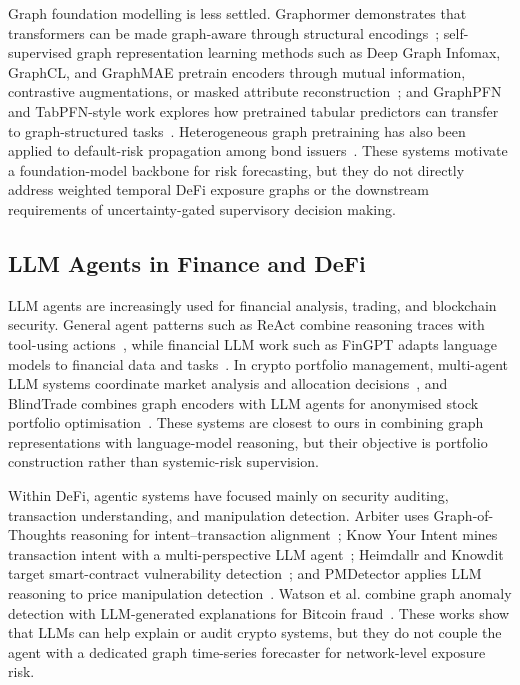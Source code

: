 Graph foundation modelling is less settled. Graphormer demonstrates that
transformers can be made graph-aware through structural
encodings~\cite{Ying2021Graphormer}; self-supervised graph representation
learning methods such as Deep Graph Infomax, GraphCL, and GraphMAE pretrain
encoders through mutual information, contrastive augmentations, or masked
attribute reconstruction~\cite{VelickovicEtAl2019DGI,YouEtAl2020GraphCL,
HouEtAl2022GraphMAE}; and GraphPFN and TabPFN-style work explores how
pretrained tabular predictors can transfer to graph-structured tasks~\cite{
HollmannEtAl2025TabPFN,eremeev2025turningtabularfoundationmodels}. Heterogeneous
graph pretraining has also been applied to default-risk propagation among bond
issuers~\cite{li2025hgmae}. These systems motivate a foundation-model backbone
for risk forecasting, but they do not directly address weighted temporal DeFi
exposure graphs or the downstream requirements of uncertainty-gated supervisory
decision making.

\subsection{LLM Agents in Finance and DeFi}

LLM agents are increasingly used for financial analysis, trading, and
blockchain security. General agent patterns such as ReAct combine reasoning
traces with tool-using actions~\cite{YaoEtAl2023ReAct}, while financial LLM
work such as FinGPT adapts language models to financial data and
tasks~\cite{YangEtAl2023FinGPT}. In crypto portfolio management, multi-agent
LLM systems coordinate market analysis and allocation decisions~\cite{
luo2025llmcrypto}, and BlindTrade combines graph encoders with LLM agents for
anonymised stock portfolio optimisation~\cite{jeon2026blindtrade}. These
systems are closest to ours in combining graph representations with
language-model reasoning, but their objective is portfolio construction rather
than systemic-risk supervision.

Within DeFi, agentic systems have focused mainly on security auditing,
transaction understanding, and manipulation detection. Arbiter uses
Graph-of-Thoughts reasoning for intent--transaction alignment~\cite{
yao2025arbiter}; Know Your Intent mines transaction intent with a
multi-perspective LLM agent~\cite{mao2025knowyourintent}; Heimdallr and
Knowdit target smart-contract vulnerability detection~\cite{
hu2026heimdallr,kong2026knowdit}; and PMDetector applies LLM reasoning to
price manipulation detection~\cite{liu2025pmdetector}. Watson et al. combine
graph anomaly detection with LLM-generated explanations for Bitcoin
fraud~\cite{watson2025explainfirst}. These works show that LLMs can help
explain or audit crypto systems, but they do not couple the agent with a
dedicated graph time-series forecaster for network-level exposure risk.


